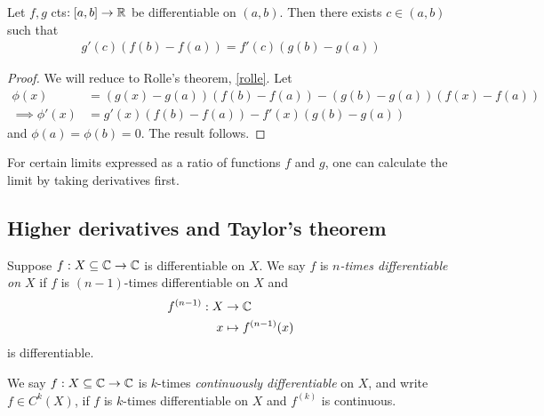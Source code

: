 \documentclass{../template/note}
\begin{document}
    \begin{proposition}
        Let \(f, g\) cts\(:[a, b] \to \mathbb R\) be differentiable on \((a, b)\). Then there exists \(c \in (a, b)\) such that
        \begin{align*}
            g'(c) \left(f(b)-f(a)\right) = f'(c)\left(g(b)-g(a)\right)
        \end{align*}
    \end{proposition}
    
    \begin{proof}
        We will reduce to Rolle's theorem, \cref{rolle}. Let
        \begin{align*}
            \phi(x) &= \left(g(x)-g(a)\right)\left(f(b)-f(a)\right) - \left(g(b)-g(a)\right)\left(f(x)-f(a)\right) \\
            \implies \phi'(x) &= g'(x)\left(f(b)-f(a)\right) - f'(x)\left(g(b)-g(a)\right)
        \end{align*}
        and \(\phi(a) = \phi(b) = 0\). The result follows.        
    \end{proof}
    
    \begin{proposition}
        For certain limits expressed as a ratio of functions \(f\) and \(g\), one can calculate the limit by taking derivatives first.
    \end{proposition}
    

    \subsection{Higher derivatives and Taylor's theorem}
    
    \begin{definition}
        Suppose \(f: X \subseteq \mathbb C \to \mathbb C\) is differentiable on \(X\). We say \(f\) is \emph{\(n\)-times differentiable on \(X\)} if \(f\) is \((n-1)\)-times differentiable on \(X\) and
        \begin{align*}
            f^{(n-1)}: X &\to \mathbb C \\
            x &\mapsto f^{(n-1)}(x)
        \end{align*}
        is differentiable.
    \end{definition}
    
    \begin{definition}
        We say \(f: X \subseteq \mathbb C \to \mathbb C\) is \(k\)-times \emph{continuously differentiable} on \(X\), and write \(f \in C^k(X)\), if \(f\) is \(k\)-times differentiable on \(X\) and \(f^{(k)}\) is continuous.
    \end{definition}
    
\end{document}
